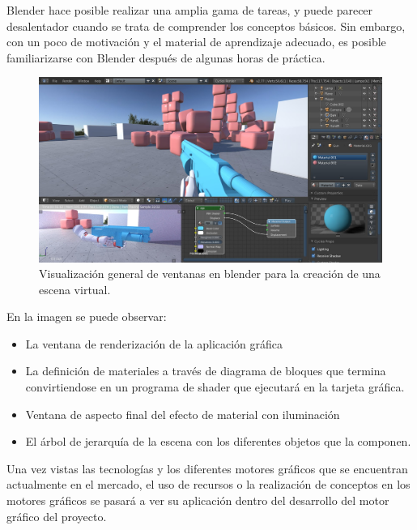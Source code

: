 \documentclass[a4paper, 17pt]{book}
\begin{document}
Blender hace posible realizar una amplia gama de tareas, y puede parecer desalentador cuando se trata de comprender los
conceptos básicos. Sin embargo, con un poco de motivación y el material de aprendizaje adecuado, es posible familiarizarse
con Blender después de algunas horas de práctica.

\begin{figure}[H]
    \centering
    \includegraphics[scale=0.20, keepaspectratio]{img/Blender.jpg}
    \caption{Visualización general de ventanas en blender para la creación de una escena virtual.}
    \label{figura:Blender}
\end{figure}

En la imagen se puede observar: 

\begin{itemize}
  \item La ventana de renderización de la aplicación gráfica

  \item La definición de materiales a través de diagrama de bloques que termina
  convirtiendose en un programa de shader que ejecutará en la tarjeta gráfica.

  \item Ventana de aspecto final del efecto de material con iluminación

  \item El árbol de jerarquía de la escena con los diferentes objetos que la componen.

\end{itemize}

Una vez vistas las tecnologías y los diferentes motores gráficos que se encuentran actualmente en el mercado,
el uso de recursos o la realización de conceptos en los motores gráficos se pasará a ver su aplicación dentro
del desarrollo del motor gráfico del proyecto.
\end{document}
